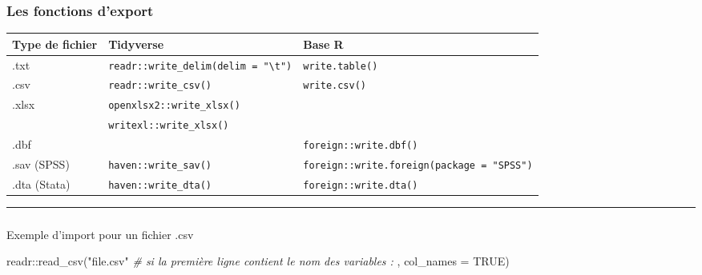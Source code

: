 \documentclass[
  french,
  10pt,
  a4paper,
]{article}
\makeatletter
\let\oldsubparagraph\subparagraph
\renewcommand{\subparagraph}{
    \@ifstar
      \xxxSubParagraphStar
      \xxxSubParagraphNoStar
  }
\newcommand{\xxxSubParagraphStar}[1]{\oldsubparagraph*{#1}\mbox{}}
\newcommand{\xxxSubParagraphNoStar}[1]{\oldsubparagraph{#1}\mbox{}}
\newenvironment{Shaded}{}{}
\newcommand{\AttributeTok}[1]{\textcolor[rgb]{0.65,0.15,0.64}{#1}}
\newcommand{\CommentTok}[1]{\textcolor[rgb]{0.63,0.63,0.65}{\textit{#1}}}
\newcommand{\ConstantTok}[1]{\textcolor[rgb]{0.60,0.41,0.00}{#1}}
\newcommand{\FunctionTok}[1]{\textcolor[rgb]{0.25,0.47,0.95}{#1}}
\newcommand{\NormalTok}[1]{\textcolor[rgb]{0.22,0.23,0.26}{#1}}
\newcommand{\SpecialCharTok}[1]{\textcolor[rgb]{0.00,0.52,0.74}{#1}}
\newcommand{\StringTok}[1]{\textcolor[rgb]{0.31,0.63,0.31}{#1}}
\newcounter{none} %
\makeatother
\begin{document}
\subsubsection{Les fonctions d'export}\label{les-fonctions-dexport}

{\def\LTcaptype{none} %
\begin{longtable}[]{@{}
  >{\raggedright\arraybackslash}p{}
  >{\raggedright\arraybackslash}p{}
  >{\raggedright\arraybackslash}p{}@{}}
\toprule\noalign{}
\begin{minipage}[b]{\linewidth}\raggedright
Type de fichier
\end{minipage} & \begin{minipage}[b]{\linewidth}\raggedright
Tidyverse
\end{minipage} & \begin{minipage}[b]{\linewidth}\raggedright
Base R
\end{minipage} \\
\midrule\noalign{}
\endhead
\bottomrule\noalign{}
\endlastfoot
.txt & \texttt{readr::write\_delim(delim\ =\ "\textbackslash{}t")} &
\texttt{write.table()} \\
.csv & \texttt{readr::write\_csv()} & \texttt{write.csv()} \\
.xlsx & \texttt{openxlsx2::write\_xlsx()} & \\
& \texttt{writexl::write\_xlsx()} & \\
.dbf & & \texttt{foreign::write.dbf()} \\
.sav (SPSS) & \texttt{haven::write\_sav()} &
\texttt{foreign::write.foreign(package\ =\ "SPSS")} \\
.dta (Stata) & \texttt{haven::write\_dta()} &
\texttt{foreign::write.dta()} \\
\end{longtable}
}

\begin{center}\rule{0.5\linewidth}{0.5pt}\end{center}

\subparagraph{Exemple d'import pour un fichier
.csv}\label{exemple-dimport-pour-un-fichier-.csv}

\begin{Shaded}
\begin{Highlighting}[]
\NormalTok{readr}\SpecialCharTok{::}\FunctionTok{read\_csv}\NormalTok{(}\StringTok{"file.csv"}
                \CommentTok{\# si la première ligne contient le nom des variables :}
\NormalTok{                , }\AttributeTok{col\_names =} \ConstantTok{TRUE}\NormalTok{)}
\end{Highlighting}
\end{Shaded}
\end{document}
